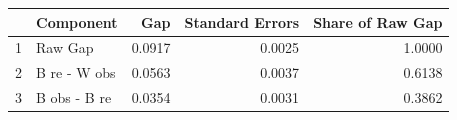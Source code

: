\begin{table}[ht]
\centering
\begin{tabular}{rlrrr}
  \hline
 & Component & Gap & Standard Errors & Share of Raw Gap \\ 
  \hline
1 & Raw Gap & 0.0917 & 0.0025 & 1.0000 \\ 
  2 & B re - W obs & 0.0563 & 0.0037 & 0.6138 \\ 
  3 & B obs - B re & 0.0354 & 0.0031 & 0.3862 \\ 
   \hline
\end{tabular}
\end{table}
